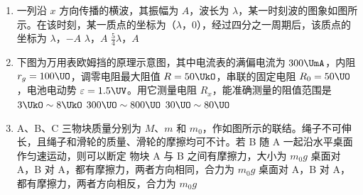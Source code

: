 \documentclass[\gkver]{gaokaozhenti}
\begin{document}
\begin{enumerate}

\item
一列沿 $x$ 方向传播的横波，其振幅为 $A$，波长为 $\lambda$，某一时刻波的图象如图所示。在该时刻，某一质点的坐标为（$\lambda$，0），经过四分之一周期后，该质点的坐标为
\onepicture[w=6.83cm]{}
{$\lambda$，$-A$}
{$\lambda$，$A$}
{$\frac{5}{4}\lambda$，$A$}


\item
下图为万用表欧姆挡的原理示意图，其中电流表的满偏电流为 $300\UmA$，内阻 $r_{g}=100\UO$，调零电阻最大阻值 $R=50\UkO$，串联的固定电阻 $R_{0}=50\UO$，电池电动势 $\varepsilon=1.5\UV$。用它测量电阻 $R_{x}$，能准确测量的阻值范围是
{$3\UkO\sim8\UkO$}
{$300\UO\sim800\UO$}
{$30\UO\sim80\UO$}


\item
A、B、C 三物块质量分别为 $M$、$m$ 和 $m_{0}$，作如图所示的联结。绳子不可伸长，且绳子和滑轮的质量、滑轮的摩擦均可不计。若 B 随 A 一起沿水平桌面作匀速运动，则可以断定
{物块 A 与 B 之间有摩擦力，大小为 $m_{0}g$}
{桌面对 A，B 对 A，都有摩擦力，两者方向相同，合力为 $m_{0}g$}
{桌面对 A，B 对 A，都有摩擦力，两者方向相反，合力为 $m_{0}g$}


\end{enumerate}
\end{document}
